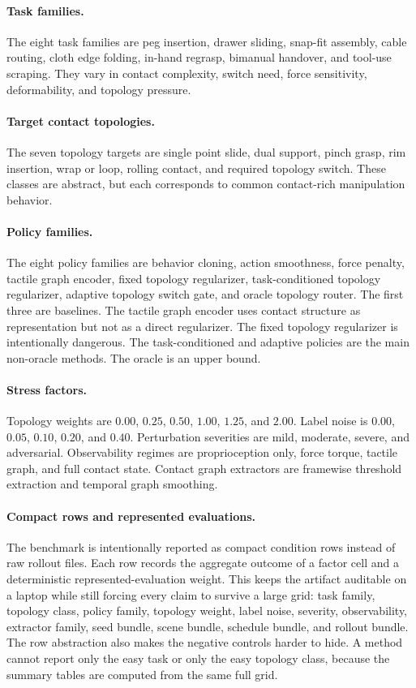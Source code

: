 \documentclass{article}
\begin{document}
\paragraph{Task families.}
The eight task families are peg insertion, drawer sliding, snap-fit assembly, cable routing, cloth edge folding, in-hand regrasp, bimanual handover, and tool-use scraping. They vary in contact complexity, switch need, force sensitivity, deformability, and topology pressure.

\paragraph{Target contact topologies.}
The seven topology targets are single point slide, dual support, pinch grasp, rim insertion, wrap or loop, rolling contact, and required topology switch. These classes are abstract, but each corresponds to common contact-rich manipulation behavior.

\paragraph{Policy families.}
The eight policy families are behavior cloning, action smoothness, force penalty, tactile graph encoder, fixed topology regularizer, task-conditioned topology regularizer, adaptive topology switch gate, and oracle topology router. The first three are baselines. The tactile graph encoder uses contact structure as representation but not as a direct regularizer. The fixed topology regularizer is intentionally dangerous. The task-conditioned and adaptive policies are the main non-oracle methods. The oracle is an upper bound.

\paragraph{Stress factors.}
Topology weights are $0.00$, $0.25$, $0.50$, $1.00$, $1.25$, and $2.00$. Label noise is $0.00$, $0.05$, $0.10$, $0.20$, and $0.40$. Perturbation severities are mild, moderate, severe, and adversarial. Observability regimes are proprioception only, force torque, tactile graph, and full contact state. Contact graph extractors are framewise threshold extraction and temporal graph smoothing.

\paragraph{Compact rows and represented evaluations.}
The benchmark is intentionally reported as compact condition rows instead of raw rollout files. Each row records the aggregate outcome of a factor cell and a deterministic represented-evaluation weight. This keeps the artifact auditable on a laptop while still forcing every claim to survive a large grid: task family, topology class, policy family, topology weight, label noise, severity, observability, extractor family, seed bundle, scene bundle, schedule bundle, and rollout bundle. The row abstraction also makes the negative controls harder to hide. A method cannot report only the easy task or only the easy topology class, because the summary tables are computed from the same full grid.
\end{document}
